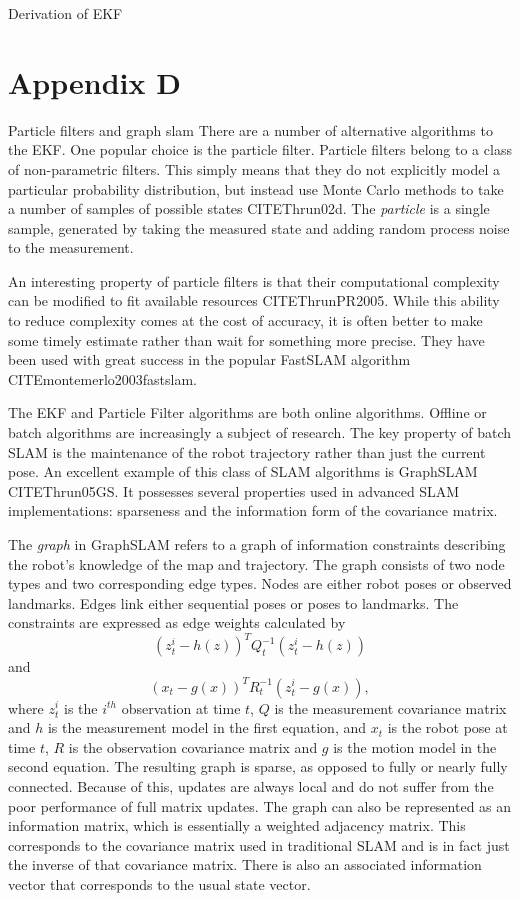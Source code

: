 \documentclass[12pt]{report}
\begin{document}
Derivation of EKF

\chapter{Appendix D}
Particle filters and graph slam
There are a number of alternative algorithms to the EKF.  One popular choice is the particle filter.  Particle filters belong to a class of non-parametric filters.  This simply means that they do not explicitly model a particular probability distribution, but instead use Monte Carlo methods to take a number of samples of possible states CITE{Thrun02d}.   The \emph{particle} is a single sample, generated by taking the measured state and adding random process noise to the measurement.  

An interesting property of particle filters is that their computational complexity can be modified to fit available resources CITE{ThrunPR2005}.  While this ability to reduce complexity comes at the cost of accuracy, it is often better to make some timely estimate rather than wait for something more precise.  They have been used with great success in the popular FastSLAM algorithm CITE{montemerlo2003fastslam}.

The EKF and Particle Filter algorithms are both online algorithms.  Offline or batch algorithms are increasingly a subject of research.  The key property of batch SLAM is the maintenance of the robot trajectory rather than just the current pose.   An excellent example of this class of SLAM algorithms is GraphSLAM CITE{Thrun05GS}.  It possesses several properties used in advanced SLAM implementations: sparseness and the information form of the covariance matrix.

The \emph{graph} in GraphSLAM refers to a graph of information constraints describing the robot's knowledge of the map and trajectory.  The graph consists of two node types and two corresponding edge types.  Nodes are either robot poses or observed landmarks.  Edges link either sequential poses or poses to landmarks.  The constraints are expressed as edge weights calculated by 
\begin{equation}\label{constraint1}
(z_{t}^{i} - h(z))^TQ_{t}^{-1}(z_{t}^{i} - h(z)) 
\end{equation}
and 
\begin{equation}\label{constraint2}
(x_{t} - g(x))^TR_{t}^{-1}(z_{t}^{i} - g(x)),
\end{equation}
 where $z_t^i$ is the $i^{th}$ observation at time $t$, $Q$ is the measurement covariance matrix and $h$ is the measurement model in the first equation, and $x_{t}$ is the robot pose at time $t$, $R$ is the observation covariance matrix and $g$ is the motion model in the second equation.  The resulting graph is sparse, as opposed to fully or nearly fully connected.  Because of this, updates are always local and do not suffer from the poor performance of full matrix updates.  The graph can also be represented as an information matrix, which is essentially a weighted adjacency matrix.  This corresponds to the covariance matrix used in traditional SLAM and is in fact just the inverse of that covariance matrix.  There is also an associated information vector that corresponds to the usual state vector.  
\end{document}

